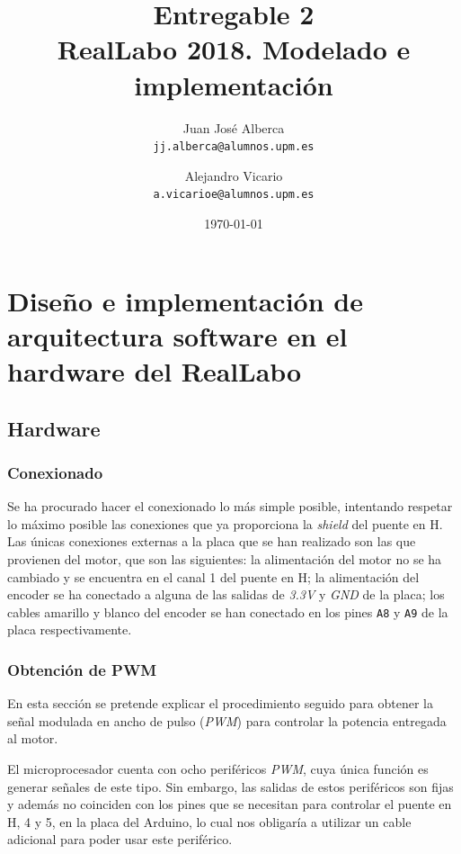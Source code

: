 \documentclass[a4paper]{article}
\begin{document}
\title{Entregable 2 \\
\large RealLabo 2018. Modelado e implementación}
\author{
	Juan José Alberca\\
	\texttt{jj.alberca@alumnos.upm.es}
	\and
	Alejandro Vicario\\
	\texttt{a.vicarioe@alumnos.upm.es}
}
\date{\today}


\maketitle


\section{Diseño e implementación de arquitectura software en el hardware del RealLabo}
\subsection{Hardware}

\subsubsection{Conexionado}
Se ha procurado hacer el conexionado lo más simple posible, intentando respetar lo máximo posible las conexiones que ya proporciona la \emph{shield} del puente en H.
Las únicas conexiones externas a la placa que se han realizado son las que provienen del motor, que son las siguientes:
la alimentación del motor no se ha cambiado y se encuentra en el canal 1 del puente en H;
la alimentación del encoder se ha conectado a alguna de las salidas de \emph{3.3V} y \emph{GND} de la placa;
los cables amarillo y blanco del encoder se han conectado en los pines \texttt{A8} y \texttt{A9} de la placa respectivamente.

\subsubsection{Obtención de PWM}
En esta sección se pretende explicar el procedimiento seguido para obtener la señal modulada en ancho de pulso (\emph{PWM}) para controlar la potencia entregada al motor.

El microprocesador cuenta con ocho periféricos \emph{PWM}, cuya única función es generar señales de este tipo. Sin embargo,
las salidas de estos periféricos son fijas y además no coinciden con los pines que se necesitan para controlar el puente en H, 4 y 5, en la placa del Arduino,
lo cual nos obligaría a utilizar un cable adicional para poder usar este periférico.
\end{document}
